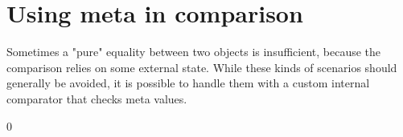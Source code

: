 \chapter{Using {\ttfamily meta} in comparison }
\hypertarget{md__c_1_2_users_2saket_2_one_drive_2_desktop_2e_pathshala_2epathshala-_web_2node__modules_2fast-eef42a02399c014c67a414f1b4bb0fc7}{}\label{md__c_1_2_users_2saket_2_one_drive_2_desktop_2e_pathshala_2epathshala-_web_2node__modules_2fast-eef42a02399c014c67a414f1b4bb0fc7}
\label{md__c_1_2_users_2saket_2_one_drive_2_desktop_2e_pathshala_2epathshala-_web_2node__modules_2fast-eef42a02399c014c67a414f1b4bb0fc7_autotoc_md11112}%
%


Sometimes a "{}pure"{} equality between two objects is insufficient, because the comparison relies on some external state. While these kinds of scenarios should generally be avoided, it is possible to handle them with a custom internal comparator that checks {\ttfamily meta} values.


\begin{DoxyCode}{0}
\DoxyCodeLine{}
\DoxyCodeLine{\}}
\DoxyCodeLine{}
\DoxyCodeLine{}
\DoxyCodeLine{\});}

\end{DoxyCode}
 